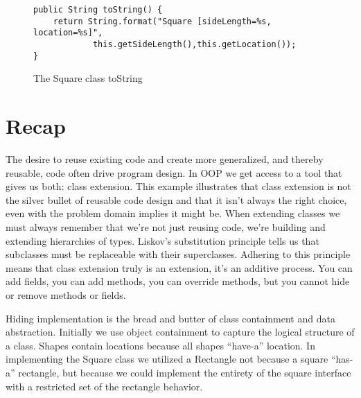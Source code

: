 \documentclass[]{tufte-handout}
\begin{document}
\begin{figure}
\begin{lstlisting}
public String toString() {
	return String.format("Square [sideLength=%s, location=%s]",
			this.getSideLength(),this.getLocation());
}	
\end{lstlisting}
\label{fig:squtostr}
\caption{The Square class toString}
\end{figure}


\section{Recap}

The desire to reuse existing code and create more generalized, and thereby reusable, code often drive program design. In OOP we get access to a tool that gives us both: class extension. This example illustrates that class extension is not the silver bullet of reusable code design and that it isn't always the right choice, even with the problem domain implies it might be. When extending classes we must always remember that we're not just reusing code, we're building and extending hierarchies of types. Liskov's substitution principle tells us that subclasses must be replaceable with their superclasses. Adhering to this principle means that class extension truly is an extension, it's an additive process. You can add fields, you can add methods, you can override methods, but you cannot hide or remove methods or fields. 

Hiding implementation is the bread and butter of class containment and data abstraction.  Initially we use object containment to capture the logical structure of a class. Shapes contain locations because all shapes ``have-a'' location. In implementing the Square class we utilized a Rectangle not because a square ``has-a'' rectangle, but because we could implement the entirety of the square interface with a restricted set of the rectangle behavior.   
\end{document}
